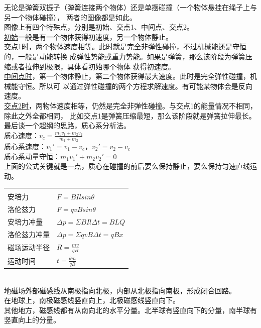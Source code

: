 \documentclass[a4paper, landscape, 10pt, twocolumn]{article}
\begin{document}
无论是弹簧双振子（弹簧连接两个物体）还是单摆碰撞（一个物体悬挂在绳子上与另一个物体碰撞），
两者的图像都是如此。\\
图像上有四个特殊点，分别是初始、交点1、中间点、交点2。\\
\uline{初始}一般是有一个物体获得初速度，另一个物体静止。\\
\uline{交点1时}，两个物体速度相等。此时就是完全非弹性碰撞，不过机械能还是守恒的，一般是动能转换
成弹性势能或重力势能。如果是弹簧，那么该阶段为弹簧压缩或者拉伸到极限，具体看初始哪个物体
获得初速度。\\
\uline{中间点时}，第一个物体静止，第二个物体获得最大速度。此时是完全弹性碰撞，机械能守恒。所以可
以通过弹性碰撞的两个方程求解速度。有可能某物体会是反向速度。\\
\uline{交点2时}，两物体速度相等，仍然是完全非弹性碰撞。与交点1的能量情况不相同，除此之外全都相同，
比如交点1是弹簧压缩最短，那么该阶段就是弹簧拉伸最长。\\
最后谈一个超纲的思路，质心系分析法。\\
质心速度：$v_c=\frac{m_1v_1+m_2v_2}{m_1+m_2}$\\
质心系速度：$v_1' = v_1 - v_c$，$v_2' = v_2 - v_c$\\
质心系动量守恒：$m_1v_1' + m_2v_2' = 0$\\
上面的公式关键就是一点，质心在碰撞的前后要么保持静止，要么保持匀速直线运动。\\
\begin{tabularx}{\columnwidth}{XX}
  \rowcolor{blue!30}
  \multicolumn{2}{l}{\parbox[c][2.5\ht\strutbox][c]{0.9\columnwidth}{\Large 磁场}} \\
  安培力&$F=BIlsin\theta$\\
  洛伦兹力&$F=qvBsin\theta$\\
  安培力冲量&$\Delta p=\varSigma BIl\Delta t=BLQ$\\
  洛伦兹力冲量&$\Delta p=\varSigma qvB\Delta t=qBx$\\
  磁场运动半径&$R=\frac{mv}{qB}$\\
  运动时间&$t=\frac{\theta m}{qB}$\\
\end{tabularx}
\\
地磁场外部磁感线从南极指向北极，内部从北极指向南极，形成闭合回路。\\
在地球上，南极磁感线竖直向上，北极磁感线竖直向下。\\
其他地方，磁感线都有从南向北的水平分量。北半球有竖直向下的分量，南半球有竖直向上的分量。\\
\end{document}
